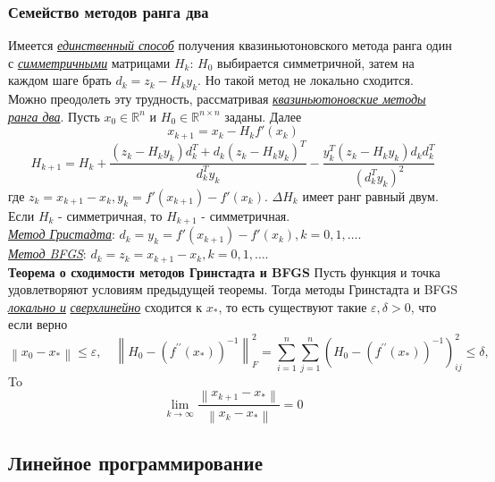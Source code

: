 \documentclass[A4]{article}
\begin{document}
\subsubsection{Семейство методов ранга два}
Имеется \underline{\emph{единственный способ}} получения квазиньютоновского метода ранга один с \underline{\emph{симметричными}} матрицами $H_k$: $H_0$ выбирается симметричной, затем на каждом шаге брать $d_k=z_k-H_ky_k$. Но такой метод не локально сходится.\\
Можно преодолеть эту трудность, рассматривая \underline{\emph{квазиньютоновские методы ранга два}}. Пусть $x_0\in\mathbb{R}^n$ и $H_0\in\mathbb{R}^{n\times n}$ заданы. Далее
\begin{equation*}
x_{k+1}=x_k-H_kf'(x_k)
\end{equation*}
\begin{equation*}
H_{k+1}=H_k+\frac{(z_k-H_ky_k)d^T_k+d_k(z_k-H_ky_k)^T}{d^T_ky_k}-\frac{y_k^T(z_k-H_ky_k)d_kd^T_k}{(d^T_ky_k)^2}
\end{equation*}
где $z_k=x_{k+1}-x_k,y_k=f'(x_{k+1})-f'(x_k)$. $\Delta H_k$ имеет ранг равный двум. Если $H_k$ - симметричная, то $H_{k+1}$ - симметричная.\\
\underline{\emph{Метод Гристадта}}: $d_k=y_k=f'(x_{k+1})-f'(x_k),k=0,1,\ldots$.\\
\underline{\emph{Метод BFGS}}:  $d_k=z_k=x_{k+1}-x_k,k=0,1,\ldots$.\\
\textbf{Теорема о сходимости методов Гринстадта и BFGS} Пусть функция и точка удовлетворяют условиям предыдущей теоремы. Тогда методы Гринстадта и BFGS
\underline{\emph{локально и}} \underline{\emph{сверхлинейно}} сходится к $ x_{*} $, то есть существуют такие $ \varepsilon, \delta>0$, что если верно
\begin{equation*}
\left\|x_{0}-x_{*}\right\| \leqslant \varepsilon, \quad\left\|H_{0}-\left(f^{\prime \prime}\left(x_{*}\right)\right)^{-1}\right\|_{F}^{2}=\sum_{i=1}^{n} \sum_{j=1}^{n}\left(H_{0}-\left(f^{\prime \prime}\left(x_{*}\right)\right)^{-1}\right)_{i j}^{2} \leqslant \delta,
\end{equation*}
To
\begin{equation*}
\lim _{k \rightarrow \infty} \frac{\left\|x_{k+1}-x_{*}\right\|}{\left\|x_{k}-x_{*}\right\|}=0
\end{equation*}
\subsection{Линейное программирование}
\end{document}
